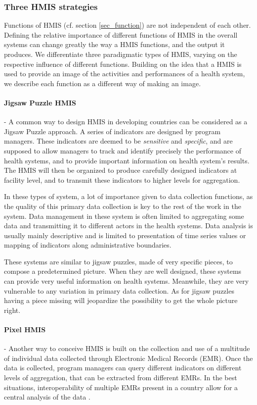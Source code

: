 \documentclass[a4paper,11pt,final,twoside]{article}
\begin{document}
\subsubsection{Three HMIS strategies}

Functions of HMIS (cf. section \ref{sec_function}) are not independent of each other. Defining the relative importance of different functions of HMIS in the overall systems can change greatly the way a HMIS functions, and the output it produces. We differentiate three paradigmatic types of HMIS, varying on the respective influence of different functions. Building on the idea that a HMIS is used to provide an image of the activities and performances of a health system, we describe each function as a different way of making an image.

\paragraph{Jigsaw Puzzle HMIS} - A common way to design HMIS in developing countries can be considered as a Jigsaw Puzzle approach. A series of indicators are designed by program managers. These indicators are deemed to be \textit{sensitive} and \textit{specific}, and are supposed to allow managers to track and identify precisely the performance of health systems, and to provide important information on health system's results. The HMIS will then be organized to produce carefully designed indicators at facility level, and to transmit these indicators to higher levels for aggregation. 

In these types of system, a lot of importance given to data collection functions, as the quality of this primary data collection is key to the rest of the work in the system. Data management in these system is often limited to aggregating some data and transmitting it to different actors in the health systems. Data analysis is usually mainly descriptive and is limited to presentation of time series values or mapping of indicators along administrative boundaries.

These systems are similar to jigsaw puzzles, made of very specific pieces, to compose a predetermined picture. When they are well designed, these systems can provide very useful information on health systems. Meanwhile, they are very vulnerable to any variation in primary data collection. As for jigsaw puzzles having a piece missing will jeopardize the possibility to get the whole picture right.

\paragraph{Pixel HMIS} - Another way to conceive HMIS is built on the collection and use of a multitude of individual data collected through Electronic Medical Records (EMR). Once the data is collected, program managers can query different indicators on different levels of aggregation, that can be extracted from different EMRs. In the best situations, interoperability of multiple EMRs present in a country allow for a central analysis of the data \cite{pugliese2009large}. 
\end{document}
